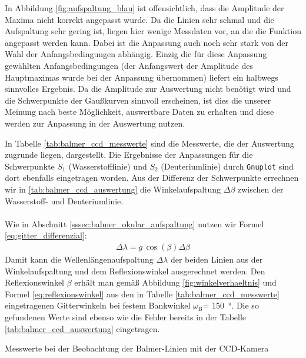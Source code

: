 \documentclass[11pt, a4paper]{article}
\numberwithin{equation}{section}
\begin{document}
\FloatBarrier
In Abbildung \ref{fig:aufspaltung_blau} ist offensichtlich, dass die Amplitude der Maxima nicht korrekt angepasst wurde.
Da die Linien sehr schmal und die Aufspaltung sehr gering ist, liegen hier wenige Messdaten vor, an die die Funktion angepasst werden kann.
Dabei ist die Anpassung auch noch sehr stark von der Wahl der Anfangsbedingungen abhängig.
Einzig die für diese Anpassung gewählten Anfangsbedingungen (der Anfangswert der Amplitude des Hauptmaximas wurde bei der Anpassung übernommen) liefert ein halbwegs sinnvolles Ergebnis.
Da die Amplitude zur Auswertung nicht benötigt wird und die Schwerpunkte der Gaußkurven sinnvoll erscheinen, ist dies die unserer Meinung nach beste Möglichkeit, auswertbare Daten zu erhalten und diese werden zur Anpassung in der Auswertung nutzen.

In Tabelle \ref{tab:balmer_ccd_messwerte} sind die Messwerte, die der Auswertung zugrunde liegen, dargestellt.
Die Ergebnisse der Anpassungen für die Schwerpunkte $S_1$ (Wasserstofflinie) und $S_2$ (Deuteriumlinie) durch \texttt{Gnuplot} sind dort ebenfalls eingetragen worden.
Aus der Differenz der Schwerpunkte errechnen wir in \ref{tab:balmer_ccd_auswertung} die Winkelaufspaltung $\Delta\beta$ zwischen der Wasserstoff- und Deuteriumlinie.\\
\\
Wie in Abschnitt \ref{sssec:balmer_okular_aufspaltung} nutzen wir Formel \eqref{eq:gitter_differenzial}:
\begin{align*}
\Delta\lambda=g\,\cos(\beta)\Delta\beta
\end{align*}
Damit kann die Wellenlängenaufspaltung $\Delta\lambda$ der beiden Linien aus der Winkelaufspaltung und dem Reflexionswinkel ausgerechnet werden.
Den Reflexionswinkel $\beta$ erhält man gemäß Abbildung \ref{fig:winkelverhaeltnis} und Formel  \eqref{eq:reflexionswinkel} aus den in Tabelle \ref{tab:balmer_ccd_messwerte} eingetragenen Gitterwinkeln bei festem Bankwinkel $\omega_\text{B}$= \SI{150}{\degree}.
Die so gefundenen Werte sind ebenso wie die Fehler bereits in der Tabelle \ref{tab:balmer_ccd_auswertung} eingetragen.
\begin{table}[h]
\centering
\resizebox{\columnwidth}{!}{%
}
\caption{Messwerte bei der Beobachtung der Balmer-Linien mit der CCD-Kamera}
\label{tab:balmer_ccd_messwerte}
\end{table}
\end{document}
